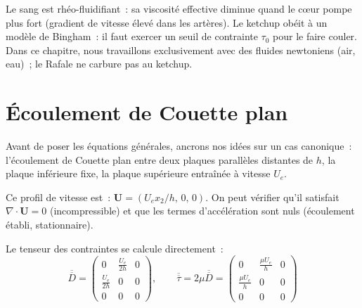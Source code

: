 \documentclass[11pt,a4paper]{report}
\newcommand{\ten}[1]{\overline{\overline{#1}}}   %
\begin{document}
Le sang est rhéo-fluidifiant~: sa viscosité effective diminue quand le cœur pompe
plus fort (gradient de vitesse élevé dans les artères). Le ketchup obéit à un
modèle de Bingham~: il faut exercer un seuil de contrainte $\tau_0$ pour le faire
couler. Dans ce chapitre, nous travaillons exclusivement avec des fluides newtoniens
(air, eau)~; le Rafale ne carbure pas au ketchup.

\section{Écoulement de Couette plan}

Avant de poser les équations générales, ancrons nos idées sur un cas canonique~:
l'écoulement de Couette plan entre deux plaques parallèles distantes de $h$, la
plaque inférieure fixe, la plaque supérieure entraînée à vitesse $U_e$.

Ce profil de vitesse est~: $\bm{U}=(U_e x_2/h,\, 0,\, 0)$.
On peut vérifier qu'il satisfait $\nabla\cdot\bm{U}=0$ (incompressible) et que les
termes d'accélération sont nuls (écoulement établi, stationnaire).

\begin{center}
\end{center}

Le tenseur des contraintes se calcule directement~:
\[
    \ten{D} = \begin{pmatrix} 0 & \frac{U_e}{2h} & 0 \\ \frac{U_e}{2h} & 0 & 0 \\ 0 & 0 & 0 \end{pmatrix},
    \qquad
    \ten{\tau} = 2\mu\ten{D} = \begin{pmatrix} 0 & \frac{\mu U_e}{h} & 0 \\ \frac{\mu U_e}{h} & 0 & 0 \\ 0 & 0 & 0 \end{pmatrix}
\]
\end{document}
